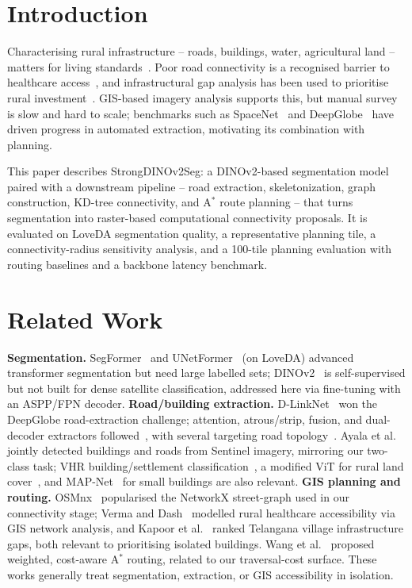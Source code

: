 \documentclass[runningheads]{llncs}
\begin{document}
\section{Introduction}
Characterising rural infrastructure -- roads, buildings, water, agricultural land -- matters for living standards~\cite{hinton1996}. Poor road connectivity is a recognised barrier to healthcare access~\cite{verma2020}, and infrastructural gap analysis has been used to prioritise rural investment~\cite{kapoor2021}. GIS-based imagery analysis supports this, but manual survey is slow and hard to scale; benchmarks such as SpaceNet~\cite{vanetten2018} and DeepGlobe~\cite{demir2018} have driven progress in automated extraction, motivating its combination with planning.

This paper describes StrongDINOv2Seg: a DINOv2-based segmentation model paired with a downstream pipeline -- road extraction, skeletonization, graph construction, KD-tree connectivity, and A$^{*}$ route planning -- that turns segmentation into raster-based computational connectivity proposals. It is evaluated on LoveDA segmentation quality, a representative planning tile, a connectivity-radius sensitivity analysis, and a 100-tile planning evaluation with routing baselines and a backbone latency benchmark.

\section{Related Work}
\textbf{Segmentation.} SegFormer~\cite{xie2021} and UNetFormer~\cite{wang2022unet} (on LoveDA) advanced transformer segmentation but need large labelled sets; DINOv2~\cite{oquab2023} is self-supervised but not built for dense satellite classification, addressed here via fine-tuning with an ASPP/FPN decoder. \textbf{Road/building extraction.} D-LinkNet~\cite{zhou2018} won the DeepGlobe road-extraction challenge; attention, atrous/strip, fusion, and dual-decoder extractors followed~\cite{bai2025,ma2026,zhang2024,qu2025}, with several targeting road topology~\cite{kamada2021,mattyus2017,xu2023,liu2017}. Ayala et al.~\cite{ayala2021} jointly detected buildings and roads from Sentinel imagery, mirroring our two-class task; VHR building/settlement classification~\cite{dimassi2024,kakooei2026}, a modified ViT for rural land cover~\cite{wassan2025}, and MAP-Net~\cite{zhu2021} for small buildings are also relevant. \textbf{GIS planning and routing.} OSMnx~\cite{boeing2017} popularised the NetworkX street-graph used in our connectivity stage; Verma and Dash~\cite{verma2020} modelled rural healthcare accessibility via GIS network analysis, and Kapoor et al.~\cite{kapoor2021} ranked Telangana village infrastructure gaps, both relevant to prioritising isolated buildings. Wang et al.~\cite{wang2022astar} proposed weighted, cost-aware A$^{*}$ routing, related to our traversal-cost surface. These works generally treat segmentation, extraction, or GIS accessibility in isolation.
\end{document}
